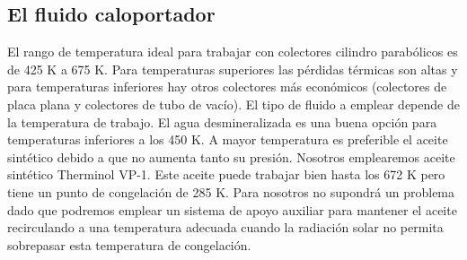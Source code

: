 \subsection{El fluido caloportador}
\label{fluidocaloportador}

El rango de temperatura ideal para trabajar con colectores cilindro parabólicos es de 425 K a 675 K.
Para temperaturas superiores las pérdidas térmicas son altas y para temperaturas inferiores hay otros
colectores más económicos (colectores de placa plana y colectores de tubo de vacío).
El tipo de fluido a emplear depende de la temperatura de trabajo. El agua desmineralizada es una buena opción para temperaturas inferiores a los 450 K. A mayor temperatura es preferible el aceite sintético debido a que no aumenta tanto su presión. Nosotros emplearemos aceite sintético Therminol VP-1. Este aceite puede trabajar bien hasta los 672 K pero tiene un punto de congelación de 285 K. Para nosotros no supondrá un problema dado que podremos emplear un sistema de apoyo auxiliar para mantener el aceite recirculando a una temperatura adecuada cuando la radiación solar no permita sobrepasar esta temperatura de congelación.
